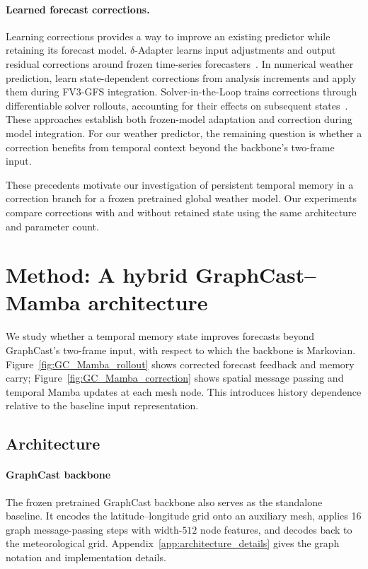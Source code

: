 \documentclass{article}
\newcommand{\vfourchange}[1]{{\color{blue}#1}}
\begin{document}
\paragraph{Learned forecast corrections.}
Learning corrections provides a way to improve an existing predictor while retaining its forecast model. $\delta$-Adapter learns input adjustments and output residual corrections around frozen time-series forecasters~\citep{liang2026forecast}. In numerical weather prediction, \citet{chen2022correcting} learn state-dependent corrections from analysis increments and apply them during FV3-GFS integration. Solver-in-the-Loop trains corrections through differentiable solver rollouts, accounting for their effects on subsequent states~\citep{um2020solver}. These approaches establish both frozen-model adaptation and correction during model integration. For our weather predictor, the remaining question is whether a correction benefits from temporal context beyond the backbone's two-frame input.

These precedents motivate our investigation of persistent temporal memory in a correction branch for a frozen pretrained global weather model. Our experiments compare corrections with and without retained state using the same architecture and parameter count.
\par
\endgroup


\section{Method: A hybrid GraphCast--Mamba architecture}


\vfourchange{We study whether a temporal memory state improves forecasts beyond GraphCast's two-frame input, with respect to which the backbone is Markovian. Figure~\ref{fig:GC_Mamba_rollout} shows corrected forecast feedback and memory carry; Figure~\ref{fig:GC_Mamba_correction} shows spatial message passing and temporal Mamba updates at each mesh node. This introduces history dependence relative to the baseline input representation.}

\subsection{{Architecture}}

\paragraph{{GraphCast backbone}}
\vfourchange{The frozen pretrained GraphCast backbone also serves as the standalone baseline. It encodes the latitude--longitude grid onto an auxiliary mesh, applies 16 graph message-passing steps with width-$512$ node features, and decodes back to the meteorological grid. Appendix~\ref{app:architecture_details} gives the graph notation and implementation details.}
\end{document}
